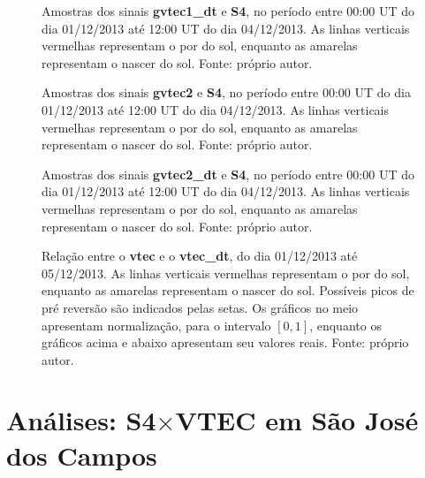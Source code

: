 \begin{figure}[H]
\centering
{}
\caption{Amostras dos sinais {\bf gvtec1\_dt} e {\bf S4}, no período entre 00:00 UT do dia 01/12/2013 até 12:00 UT do dia 04/12/2013. As linhas verticais vermelhas representam o por do sol, enquanto as amarelas representam o nascer do sol. Fonte: próprio autor.}
\label{fig:scattergvtec1dt}
\end{figure}

\begin{figure}[H]
\centering
{}
\caption{Amostras dos sinais {\bf gvtec2} e {\bf S4}, no período entre 00:00 UT do dia 01/12/2013 até 12:00 UT do dia 04/12/2013. As linhas verticais vermelhas representam o por do sol, enquanto as amarelas representam o nascer do sol. Fonte: próprio autor.}
\label{fig:scattergvtec2}
\end{figure}

\begin{figure}[H]
\centering
{}
\caption{Amostras dos sinais {\bf gvtec2\_dt} e {\bf S4}, no período entre 00:00 UT do dia 01/12/2013 até 12:00 UT do dia 04/12/2013. As linhas verticais vermelhas representam o por do sol, enquanto as amarelas representam o nascer do sol. Fonte: próprio autor.}
\label{fig:scattergvtec2dt}
\end{figure}

\begin{figure}[H]
\centering
{}

\caption{Relação entre o {\bf vtec} e o {\bf vtec\_dt}, do dia 01/12/2013 até 05/12/2013. As linhas verticais vermelhas representam o por do sol, enquanto as amarelas representam o nascer do sol. Possíveis picos de pré reversão são indicados pelas setas. Os gráficos no meio apresentam normalização, para o intervalo $[0,1]$, enquanto os gráficos acima e abaixo apresentam seu valores reais.  Fonte: próprio autor.}
\label{fig:vtec_vtec_dt}
\end{figure}


\section{Análises: S4$\times$VTEC em São José dos Campos}

